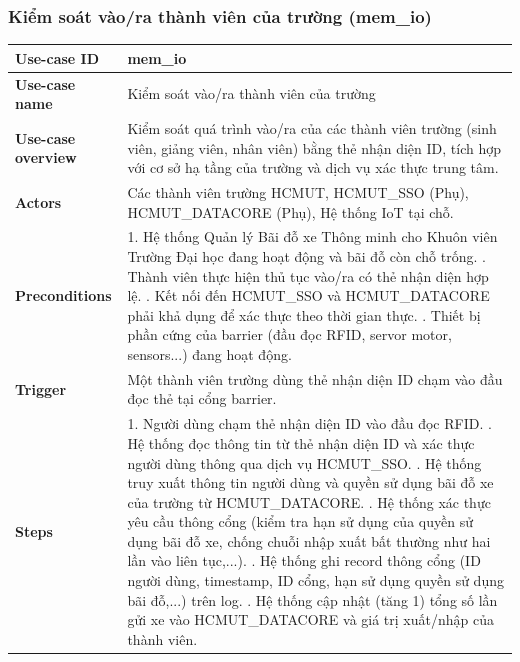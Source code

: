 \subsubsection{Kiểm soát vào/ra thành viên của trường (mem\_io)}
\begingroup
\small
\begin{longtable}{|>{\centering\arraybackslash}m{3cm}|m{13.7cm}|}
\hline
\textbf{Use-case ID} & mem\_io \\ \hline
\textbf{Use-case name} & Kiểm soát vào/ra thành viên của trường \\ \hline
\textbf{Use-case overview} & Kiểm soát quá trình vào/ra của các thành viên trường (sinh viên, giảng viên, nhân viên) bằng thẻ nhận diện ID, tích hợp với cơ sở hạ tầng của trường và dịch vụ xác thực trung tâm. \\ \hline
\textbf{Actors} & Các thành viên trường HCMUT, HCMUT\_SSO (Phụ), HCMUT\_DATACORE (Phụ), Hệ thống IoT tại chỗ. \\ \hline
\textbf{Preconditions} & 
1. Hệ thống Quản lý Bãi đỗ xe Thông minh cho Khuôn viên Trường Đại học đang hoạt động và bãi đỗ còn chỗ trống. \newline
2. Thành viên thực hiện thủ tục vào/ra có thẻ nhận diện hợp lệ. \newline
3. Kết nối đến HCMUT\_SSO và HCMUT\_DATACORE phải khả dụng để xác thực theo thời gian thực. \newline
4. Thiết bị phần cứng của barrier (đầu đọc RFID, servor motor, sensors...) đang hoạt động. \\ \hline
\textbf{Trigger} & Một thành viên trường dùng thẻ nhận diện ID chạm vào đầu đọc thẻ tại cổng barrier. \\ \hline
\textbf{Steps} & 
1. Người dùng chạm thẻ nhận diện ID vào đầu đọc RFID. \newline
2. Hệ thống đọc thông tin từ thẻ nhận diện ID và xác thực người dùng thông qua dịch vụ HCMUT\_SSO. \newline
3. Hệ thống truy xuất thông tin người dùng và quyền sử dụng bãi đỗ xe của trường từ HCMUT\_DATACORE. \newline
4. Hệ thống xác thực yêu cầu thông cổng (kiểm tra hạn sử dụng của quyền sử dụng bãi đỗ xe, chống chuỗi nhập xuất bất thường như hai lần vào liên tục,...). \newline
5. Hệ thống ghi record thông cổng (ID người dùng, timestamp, ID cổng, hạn sử dụng quyền sử dụng bãi đỗ,...) trên log. \newline
6. Hệ thống cập nhật (tăng 1) tổng số lần gửi xe vào HCMUT\_DATACORE và giá trị xuất/nhập của thành viên. \newline

\end{longtable}
